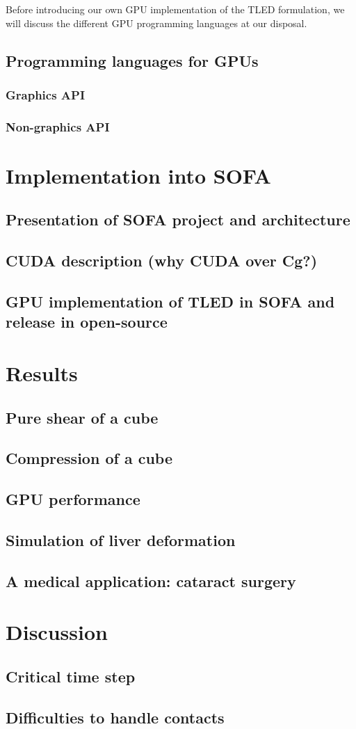 Before introducing our own GPU implementation of the TLED formulation, we will discuss the different GPU programming languages at our disposal. 


	\subsection{Programming languages for GPUs}
	
		\subsubsection*{Graphics API}
		
		\subsubsection*{Non-graphics API}

		
	
\section{Implementation into SOFA}
	\subsection{Presentation of SOFA project and architecture}
	\subsection{CUDA description (why CUDA over Cg?)}	
	\subsection{GPU implementation of TLED in SOFA and release in open-source }
	
\section{Results}	
	\subsection{Pure shear of a cube}
	\subsection{Compression of a cube}
	\subsection{GPU performance}
	\subsection{Simulation of liver deformation}
	\subsection{A medical application: cataract surgery}
	
\section{Discussion}
	\subsection{Critical time step}
	\subsection{Difficulties to handle contacts}